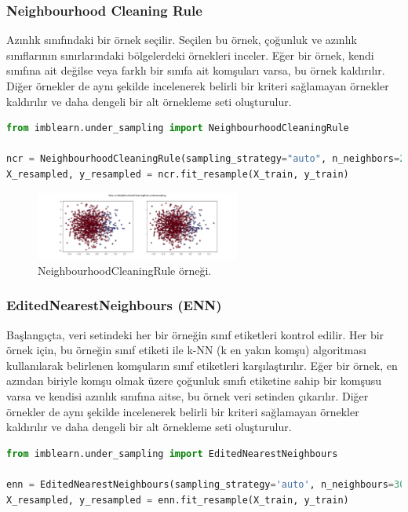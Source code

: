 \subsubsection{Neighbourhood Cleaning Rule}
Azınlık sınıfındaki bir örnek seçilir. Seçilen bu örnek, çoğunluk ve azınlık sınıflarının sınırlarındaki bölgelerdeki örnekleri inceler. Eğer bir örnek, kendi sınıfına ait değilse veya farklı bir sınıfa ait komşuları varsa, bu örnek kaldırılır. Diğer örnekler de aynı şekilde incelenerek belirli bir kriteri sağlamayan örnekler kaldırılır ve daha dengeli bir alt örnekleme seti oluşturulur.

\begin{lstlisting}[language=Python]
from imblearn.under_sampling import NeighbourhoodCleaningRule

ncr = NeighbourhoodCleaningRule(sampling_strategy="auto", n_neighbors=250, threshold_cleaning=0.5)
X_resampled, y_resampled = ncr.fit_resample(X_train, y_train)
\end{lstlisting}

\begin{figure}[h]
    \centering
    \includegraphics[width=0.6\textwidth]{images/Raw vs NeighbourhoodCleaningRule undersampling.png}
    \caption{NeighbourhoodCleaningRule örneği.}
    \label{fig:enter-label}
\end{figure}

\newpage

\subsubsection{EditedNearestNeighbours (ENN)}
Başlangıçta, veri setindeki her bir örneğin sınıf etiketleri kontrol edilir. Her bir örnek için, bu örneğin sınıf etiketi ile k-NN (k en yakın komşu) algoritması kullanılarak belirlenen komşuların sınıf etiketleri karşılaştırılır. Eğer bir örnek, en azından biriyle komşu olmak üzere çoğunluk sınıfı etiketine sahip bir komşusu varsa ve kendisi azınlık sınıfına aitse, bu örnek veri setinden çıkarılır. Diğer örnekler de aynı şekilde incelenerek belirli bir kriteri sağlamayan örnekler kaldırılır ve daha dengeli bir alt örnekleme seti oluşturulur.

\begin{lstlisting}[language=Python]
from imblearn.under_sampling import EditedNearestNeighbours

enn = EditedNearestNeighbours(sampling_strategy='auto', n_neighbours=300, kind_sel='all')
X_resampled, y_resampled = enn.fit_resample(X_train, y_train)
\end{lstlisting}

